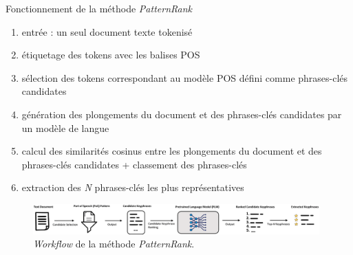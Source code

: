 \begin{frame}{Fonctionnement de la méthode \textit{PatternRank}}
\begin{enumerate}
\item entrée : un seul document texte tokenisé
\item étiquetage des tokens avec les balises POS
\item sélection des tokens correspondant au modèle POS défini comme phrases-clés candidates
\item génération des plongements du document et des phrases-clés candidates par un modèle de langue
\item calcul des similarités cosinus entre les plongements du document et des phrases-clés candidates + classement des phrases-clés
\item extraction des \textit{N} phrases-clés les plus représentatives
\end{enumerate}
\begin{figure}
    \centering
    \includegraphics[width=110mm,scale=0.5]{pic/patternrank_workflow.png}
    \caption{\textit{Workflow} de la méthode \textit{PatternRank}.}
    \label{fig:enter-label}
\end{figure}
\end{frame}